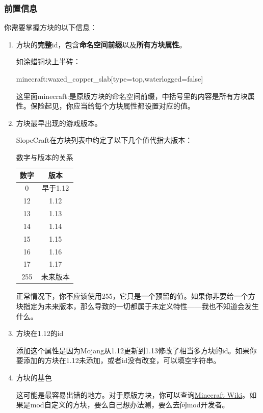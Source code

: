 \documentclass{article}
\begin{document}
   \subsubsection{前置信息}
   你需要掌握方块的以下信息：

   \begin{enumerate}
       \item 方块的\textbf{完整}id，包含\textbf{命名空间前缀}以及\textbf{所有方块属性}。
       
       如涂蜡铜块上半砖：
       
       minecraft:waxed\_copper\_slab[type=top,waterlogged=false]

       这里面minecraft:是原版方块的命名空间前缀，中括号里的内容是所有方块属性。保险起见，你应当给每个方块属性都设置对应的值。
       \item 方块最早出现的游戏版本。
       
       SlopeCraft在方块列表中约定了以下几个值代指大版本：
       \begin{table}[h]
        \centering
        \caption{数字与版本的关系}
        \label{VerAndRealVer}
        \begin{tabular}{cc}\hline
            数字 & 版本 \\ \hline
            0 & 早于1.12 \\
            12 & 1.12 \\
            13 & 1.13 \\
            14 & 1.14 \\
            15 & 1.15 \\
            16 & 1.16 \\
            17 & 1.17 \\
            255 & 未来版本 \\
            \hline            
        \end{tabular}
       \end{table}

   正常情况下，你不应该使用255，它只是一个预留的值。如果你非要给一个方块指定为未来版本，那么导致的一切都属于未定义特性——我也不知道会发生什么。

   \item 方块在1.12的id
   
   添加这个属性是因为Mojang从1.12更新到1.13修改了相当多方块的id。如果你要添加的方块在1.12未添加，或者id没有改变，可以填空字符串。
   \item 方块的基色
   
   这可能是最容易出错的地方。对于原版方块，你可以查询\href{https://wiki.biligame.com/mc/%E5%9C%B0%E5%9B%BE%E7%89%A9%E5%93%81%E6%A0%BC%E5%BC%8F#idcounts.dat_.E6.A0.BC.E5.BC.8F}{Minecraft Wiki}。如果是mod自定义的方块，要么自己想办法测，要么去问mod开发者。
   

\end{enumerate}
\end{document}
